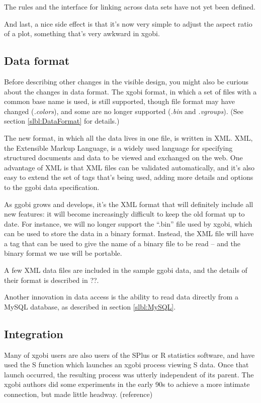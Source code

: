 \documentclass[11pt]{article}
\begin{document}
The rules and the interface for linking across data sets have not yet
been defined.

And last, a nice side effect is that it's now very simple to
adjust the aspect ratio of a plot, something that's very awkward in
xgobi.

\subsection {Data format}

Before describing other changes in the visible design, you might
also be curious about the changes in data format.  The xgobi
format, in which a set of files with a common base name is used,
is still supported, though file format may have changed ({\em .colors}),
and some are no longer supported ({\em .bin} and {\em .vgroups}).
(See section \ref{slbl:DataFormat} for details.)

The new format, in which all the data lives in one file, is written
in XML.  XML, the Extensible Markup Language, is a widely used
language for specifying structured documents and data to
be viewed and exchanged on the web.  One advantage of XML is
that XML files can be validated automatically, and it's also
easy to extend the set of tags that's being used, adding more
details and options to the ggobi data specification.

As ggobi grows and develops, it's the XML format that will
definitely include all new features: it will become increasingly
difficult to keep the old format up to date.  For instance, we
will no longer support the ``.bin'' file used by xgobi, which
can be used to store the data in a binary format.  Instead,
the XML file will have a tag that can be used to give the
name of a binary file to be read -- and the binary format we
use will be portable.

A few XML data files are included in the sample ggobi data, and
the details of their format is described in ??.

Another innovation in data access is the ability to read data
directly from a MySQL database, as described in section \ref{slbl:MySQL}.

\subsection{Integration}

Many of xgobi users are also users of the SPlus or R statistics
software, and have used the S function which launches an xgobi
process viewing S data.  Once that launch occurred, the resulting
process was utterly independent of its parent.  The xgobi authors
did some experiments in the early 90s to achieve a more intimate
connection, but made little headway.  (reference)
\end{document}
